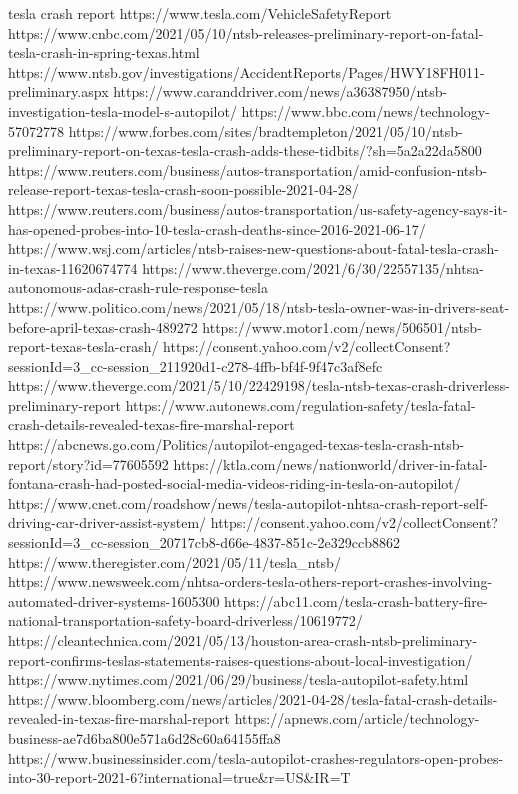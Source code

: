 tesla crash report
https://www.tesla.com/VehicleSafetyReport
https://www.cnbc.com/2021/05/10/ntsb-releases-preliminary-report-on-fatal-tesla-crash-in-spring-texas.html
https://www.ntsb.gov/investigations/AccidentReports/Pages/HWY18FH011-preliminary.aspx
https://www.caranddriver.com/news/a36387950/ntsb-investigation-tesla-model-s-autopilot/
https://www.bbc.com/news/technology-57072778
https://www.forbes.com/sites/bradtempleton/2021/05/10/ntsb-preliminary-report-on-texas-tesla-crash-adds-these-tidbits/?sh=5a2a22da5800
https://www.reuters.com/business/autos-transportation/amid-confusion-ntsb-release-report-texas-tesla-crash-soon-possible-2021-04-28/
https://www.reuters.com/business/autos-transportation/us-safety-agency-says-it-has-opened-probes-into-10-tesla-crash-deaths-since-2016-2021-06-17/
https://www.wsj.com/articles/ntsb-raises-new-questions-about-fatal-tesla-crash-in-texas-11620674774
https://www.theverge.com/2021/6/30/22557135/nhtsa-autonomous-adas-crash-rule-response-tesla
https://www.politico.com/news/2021/05/18/ntsb-tesla-owner-was-in-drivers-seat-before-april-texas-crash-489272
https://www.motor1.com/news/506501/ntsb-report-texas-tesla-crash/
https://consent.yahoo.com/v2/collectConsent?sessionId=3_cc-session_211920d1-c278-4ffb-bf4f-9f47c3af8efc
https://www.theverge.com/2021/5/10/22429198/tesla-ntsb-texas-crash-driverless-preliminary-report
https://www.autonews.com/regulation-safety/tesla-fatal-crash-details-revealed-texas-fire-marshal-report
https://abcnews.go.com/Politics/autopilot-engaged-texas-tesla-crash-ntsb-report/story?id=77605592
https://ktla.com/news/nationworld/driver-in-fatal-fontana-crash-had-posted-social-media-videos-riding-in-tesla-on-autopilot/
https://www.cnet.com/roadshow/news/tesla-autopilot-nhtsa-crash-report-self-driving-car-driver-assist-system/
https://consent.yahoo.com/v2/collectConsent?sessionId=3_cc-session_20717cb8-d66e-4837-851c-2e329ccb8862
https://www.theregister.com/2021/05/11/tesla_ntsb/
https://www.newsweek.com/nhtsa-orders-tesla-others-report-crashes-involving-automated-driver-systems-1605300
https://abc11.com/tesla-crash-battery-fire-national-transportation-safety-board-driverless/10619772/
https://cleantechnica.com/2021/05/13/houston-area-crash-ntsb-preliminary-report-confirms-teslas-statements-raises-questions-about-local-investigation/
https://www.nytimes.com/2021/06/29/business/tesla-autopilot-safety.html
https://www.bloomberg.com/news/articles/2021-04-28/tesla-fatal-crash-details-revealed-in-texas-fire-marshal-report
https://apnews.com/article/technology-business-ae7d6ba800e571a6d28c60a64155ffa8
https://www.businessinsider.com/tesla-autopilot-crashes-regulators-open-probes-into-30-report-2021-6?international=true&r=US&IR=T
